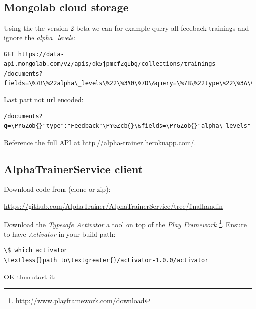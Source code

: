 \documentclass[a4paper,10pt,english,lof,lot,twoside]{puthesis}
\def\PYGZob{\char`\{}
\def\PYGZcb{\char`\}}
\begin{document}
\subsection{Mongolab cloud storage}
\label{appendix_software:appendix-alphatrainer-mongolab-cloud-storage}\label{appendix_software:mongolab-cloud-storage}
Using the the version 2 beta we can for example query all feedback trainings and ignore the \emph{alpha\_levels}:

\begin{Verbatim}[commandchars=\\\{\}]
GET https://data-api.mongolab.com/v2/apis/dk5jpmcf2g1bg/collections/trainings
/documents?fields=\%7B\%22alpha\_levels\%22\%3A0\%7D\&query=\%7B\%22type\%22\%3A\%22Feedback\%22\%7D\textless{}/code\textgreater{}
\end{Verbatim}

Last part not url encoded:

\begin{Verbatim}[commandchars=\\\{\}]
/documents?q=\PYGZob{}"type":"Feedback"\PYGZcb{}\&fields=\PYGZob{}"alpha\_levels":0\PYGZcb{}\textless{}/code\textgreater{}
\end{Verbatim}

Reference the full API at \href{http://alpha-trainer.herokuapp.com/}{http://alpha-trainer.herokuapp.com/}.


\subsection{AlphaTrainerService client}
\label{appendix_software:alphatrainerservice-client}\label{appendix_software:appendix-alphatrainerservice-client}
Download code from (clone or zip):

\href{https://github.com/AlphaTrainer/AlphaTrainerService/tree/finalhandin}{https://github.com/AlphaTrainer/AlphaTrainerService/tree/finalhandin}

Download the \emph{Typesafe Activator} a tool on top of the \emph{Play Framework}
\footnote{
\href{http://www.playframework.com/download}{http://www.playframework.com/download}
}. Ensure to have \emph{Activator} in your
build path:

\begin{Verbatim}[commandchars=\\\{\}]
\$ which activator
\textless{}path to\textgreater{}/activator-1.0.0/activator
\end{Verbatim}

OK then start it:
\end{document}
